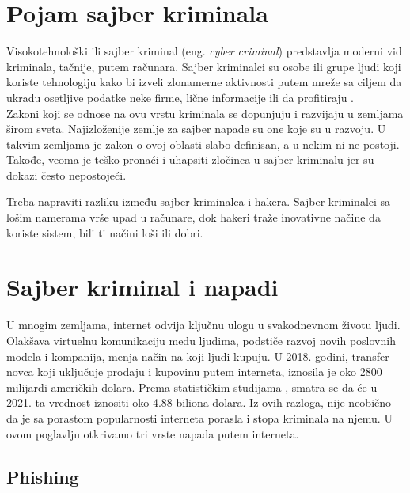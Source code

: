 \documentclass[a4paper]{article}
\begin{document}
\section{Pojam sajber kriminala}
\label{pojam}

Visokotehnološki ili sajber kriminal (eng. {\em cyber criminal}) predstavlja moderni vid kriminala, tačnije, putem računara. Sajber kriminalci su osobe ili grupe ljudi koji koriste tehnologiju kako bi izveli zlonamerne aktivnosti putem mreže sa ciljem da ukradu osetljive podatke neke firme, lične informacije ili da profitiraju \cite{sajber}.
\\Zakoni koji se odnose na ovu vrstu kriminala se dopunjuju i razvijaju u zemljama širom sveta. Najizloženije zemlje za sajber napade su one koje su u razvoju. U takvim zemljama je zakon o ovoj oblasti slabo definisan, a u nekim ni ne postoji. Takođe, veoma je teško pronaći i uhapsiti zločinca u sajber kriminalu jer su dokazi često nepostojeći.

Treba napraviti razliku između sajber kriminalca i hakera. Sajber kriminalci sa lošim namerama vrše upad u računare, dok hakeri traže inovativne načine da koriste sistem, bili ti načini loši ili dobri.
\\

 

\section{Sajber kriminal i napadi}

\label{sec:kriminal_napadi}

U mnogim zemljama, internet odvija ključnu ulogu u svakodnevnom životu ljudi. Olakšava virtuelnu komunikaciju među ljudima, podstiče razvoj novih poslovnih modela i kompanija, menja način na koji ljudi kupuju. U 2018. godini, transfer novca koji uključuje prodaju i kupovinu putem interneta, iznosila je oko 2800 milijardi američkih dolara. Prema statističkim studijama \cite{statistika}, smatra se da će u 2021. ta vrednost iznositi oko 4.88 biliona dolara. Iz ovih razloga, nije neobično da je sa porastom popularnosti interneta porasla i stopa kriminala na njemu. U ovom poglavlju otkrivamo tri vrste napada putem interneta.

\subsection{Phishing}
\label{subsec:phishing}
\end{document}
